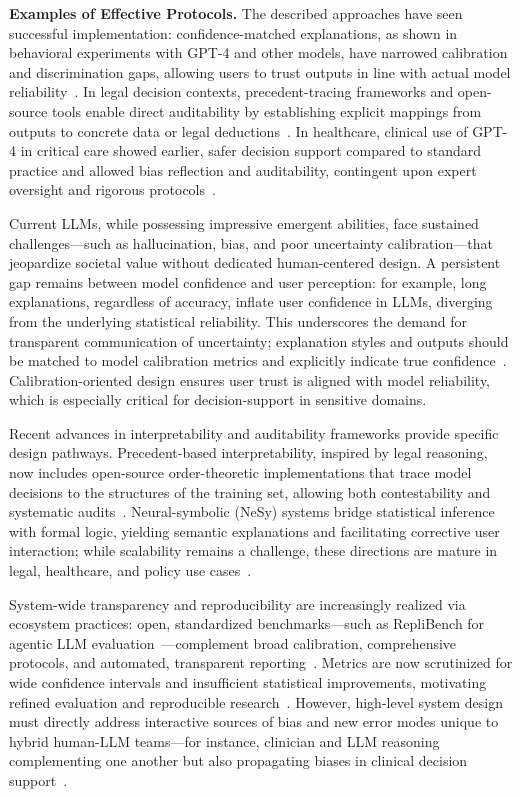 \documentclass[sigconf]{acmart}
\begin{document}
\textbf{Examples of Effective Protocols.} The described approaches have seen successful implementation: confidence-matched explanations, as shown in behavioral experiments with GPT-4 and other models, have narrowed calibration and discrimination gaps, allowing users to trust outputs in line with actual model reliability~\cite{ref35}. In legal decision contexts, precedent-tracing frameworks and open-source tools enable direct auditability by establishing explicit mappings from outputs to concrete data or legal deductions~\cite{ref46}. In healthcare, clinical use of GPT-4 in critical care showed earlier, safer decision support compared to standard practice and allowed bias reflection and auditability, contingent upon expert oversight and rigorous protocols~\cite{ref53}.

Current LLMs, while possessing impressive emergent abilities, face sustained challenges—such as hallucination, bias, and poor uncertainty calibration—that jeopardize societal value without dedicated human-centered design. A persistent gap remains between model confidence and user perception: for example, long explanations, regardless of accuracy, inflate user confidence in LLMs, diverging from the underlying statistical reliability. This underscores the demand for transparent communication of uncertainty; explanation styles and outputs should be matched to model calibration metrics and explicitly indicate true confidence~\cite{ref35}. Calibration-oriented design ensures user trust is aligned with model reliability, which is especially critical for decision-support in sensitive domains.

Recent advances in interpretability and auditability frameworks provide specific design pathways. Precedent-based interpretability, inspired by legal reasoning, now includes open-source order-theoretic implementations that trace model decisions to the structures of the training set, allowing both contestability and systematic audits~\cite{ref46}. Neural-symbolic (NeSy) systems bridge statistical inference with formal logic, yielding semantic explanations and facilitating corrective user interaction; while scalability remains a challenge, these directions are mature in legal, healthcare, and policy use cases~\cite{ref44,ref52}.

System-wide transparency and reproducibility are increasingly realized via ecosystem practices: open, standardized benchmarks—such as RepliBench for agentic LLM evaluation~\cite{ref23}—complement broad calibration, comprehensive protocols, and automated, transparent reporting~\cite{ref23,ref42}. Metrics are now scrutinized for wide confidence intervals and insufficient statistical improvements, motivating refined evaluation and reproducible research~\cite{ref42}. However, high-level system design must directly address interactive sources of bias and new error modes unique to hybrid human-LLM teams—for instance, clinician and LLM reasoning complementing one another but also propagating biases in clinical decision support~\cite{ref53,ref52}.
\end{document}
